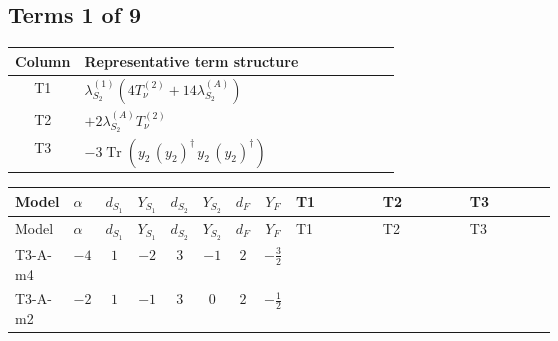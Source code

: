 \documentclass[8pt]{article}
\begin{document}
\begin{landscape}
\subsection*{Terms 1 of 9}
\begin{center}
\begin{tabular}{@{}c >{\raggedright\arraybackslash}p{0.82\linewidth}@{}}
\toprule
Column & Representative term structure \\
\midrule
T1 & \(\displaystyle {\lambda_{S_2}^{(1)}} (4 T_{\nu}^{(2)}+14 {\lambda_{S_2}^{(A)}})\) \\
\midrule
T2 & \(\displaystyle +2 {\lambda_{S_2}^{(A)}} T_{\nu}^{(2)}\) \\
\midrule
T3 & \(\displaystyle -3 \operatorname{Tr}\!\left({y_2}\,\left({y_2}\right)^{\dagger}\,{y_2}\,\left({y_2}\right)^{\dagger}\right)\) \\
\midrule
\bottomrule
\end{tabular}
\end{center}
\smallskip
\tiny
\begin{longtable}{@{}llcccccc >{\raggedright\arraybackslash}p{0.21\linewidth} >{\raggedright\arraybackslash}p{0.21\linewidth} >{\raggedright\arraybackslash}p{0.21\linewidth}@{}}
\toprule
Model & $\alpha$ & $d_{S_1}$ & $Y_{S_1}$ & $d_{S_2}$ & $Y_{S_2}$ & $d_F$ & $Y_F$ & T1 & T2 & T3 \\
\midrule
\endfirsthead
\toprule
Model & $\alpha$ & $d_{S_1}$ & $Y_{S_1}$ & $d_{S_2}$ & $Y_{S_2}$ & $d_F$ & $Y_F$ & T1 & T2 & T3 \\
\midrule
\endhead
T3-A-m4 & $-4$ & $1$ & $-2$ & $3$ & $-1$ & $2$ & $-\frac{3}{2}$ & \scriptsize\adjustbox{max width=\linewidth}{$\begin{gathered} {\lambda_{S_2}^{(1)}} (4 T_{\nu}^{(2)}+14 {\lambda_{S_2}^{(A)}})\end{gathered}$} & \scriptsize\adjustbox{max width=\linewidth}{$\begin{gathered} +2 {\lambda_{S_2}^{(A)}} T_{\nu}^{(2)}\end{gathered}$} & \scriptsize\adjustbox{max width=\linewidth}{$\begin{gathered} -3 \operatorname{Tr}\!\left({y_2}\,\left({y_2}\right)^{\dagger}\,{y_2}\,\left({y_2}\right)^{\dagger}\right)\end{gathered}$} \\
\midrule
T3-A-m2 & $-2$ & $1$ & $-1$ & $3$ & $0$ & $2$ & $-\frac{1}{2}$ & \scriptsize\adjustbox{max width=\linewidth}{$\begin{gathered} {\lambda_{S_2}^{(1)}} (4 T_{\nu}^{(2)}+14 {\lambda_{S_2}^{(A)}})\end{gathered}$} & \scriptsize\adjustbox{max width=\linewidth}{$\begin{gathered} +2 {\lambda_{S_2}^{(A)}} T_{\nu}^{(2)}\end{gathered}$} & \scriptsize\adjustbox{max width=\linewidth}{$\begin{gathered} -3 \operatorname{Tr}\!\left({y_2}\,\left({y_2}\right)^{\dagger}\,{y_2}\,\left({y_2}\right)^{\dagger}\right)\end{gathered}$} \\

\end{longtable}
\end{landscape}
\end{document}
